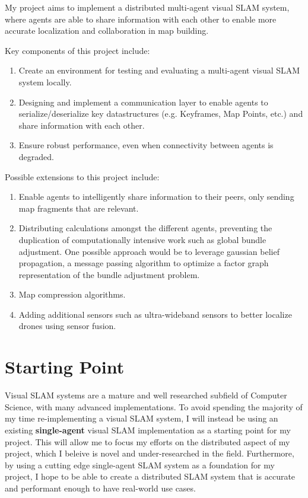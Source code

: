 \documentclass[12pt,a4paper,twoside]{article}
\begin{document}
My project aims to implement a distributed multi-agent visual SLAM system, where agents are able to share information with each other to enable more accurate localization and collaboration in map building.

Key components of this project include:
\begin{enumerate}
  \item Create an environment for testing and evaluating a multi-agent visual SLAM system locally.
  \item Designing and implement a communication layer to enable agents to serialize/deserialize key datastructures (e.g. Keyframes, Map Points, etc.) and share information with each other.
  \item Ensure robust performance, even when connectivity between agents is degraded.
\end{enumerate}


Possible extensions to this project include:
\begin{enumerate}
  \item \label{extension:intelligentSharing} Enable agents to intelligently share information to their peers, only sending map fragments that are relevant.
  \item \label{extension:distributedComputation} Distributing calculations amongst the different agents, preventing the duplication of computationally intensive work such as global bundle adjustment. One possible approach would be to leverage gaussian belief propagation, a message passing algorithm to optimize a factor graph representation of the bundle adjustment problem.
  \item \label{extension:mapCompression} Map compression algorithms.
  \item \label{extension:extraSensors} Adding additional sensors such as ultra-wideband sensors to better localize drones using sensor fusion.
\end{enumerate}

\newpage 

\section{Starting Point}

Visual SLAM systems are a mature and well researched subfield of Computer Science, with many advanced implementations. To avoid spending the majority of my time re-implementing a visual SLAM system, I will instead be using an existing \textbf{single-agent} visual SLAM implementation as a starting point for my project. This will allow me to focus my efforts on the distributed aspect of my project, which I beleive is novel and under-researched in the field. Furthermore, by using a cutting edge single-agent SLAM system as a foundation for my project, I hope to be able to create a distributed SLAM system that is accurate and performant enough to have real-world use cases. 
\end{document}
